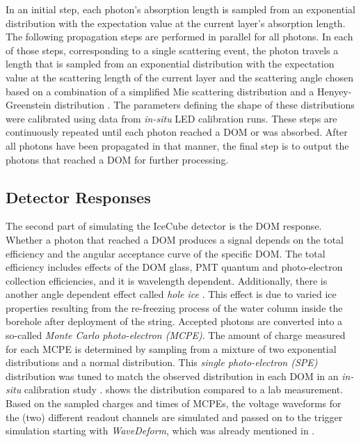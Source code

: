 In an initial step, each photon's absorption length is sampled from an exponential distribution with the expectation value at the current layer's absorption length. The following propagation steps are performed in parallel for all photons. In each of those steps, corresponding to a single scattering event, the photon travels a length that is sampled from an exponential distribution with the expectation value at the scattering length of the current layer and the scattering angle chosen based on a combination of a simplified Mie scattering distribution  and a Henyey-Greenstein distribution . The parameters defining the shape of these distributions were calibrated using data from \textit{in-situ} LED calibration runs. These steps are continuously repeated until each photon reached a DOM or was absorbed. After all photons have been propagated in that manner, the final step is to output the photons that reached a DOM for further processing.


\subsection{Detector Responses}

The second part of simulating the IceCube detector is the DOM response. Whether a photon that reached a DOM produces a signal depends on the total efficiency and the angular acceptance curve of the specific DOM. The total efficiency includes effects of the DOM glass, PMT quantum and photo-electron collection efficiencies, and it is wavelength dependent. Additionally, there is another angle dependent effect called \textit{hole ice} . This effect is due to varied ice properties resulting from the re-freezing process of the water column inside the borehole after deployment of the string.
Accepted photons are converted into a so-called \textit{Monte Carlo photo-electron (MCPE)}. The amount of charge measured for each MCPE is determined by sampling from a mixture of two exponential distributions and a normal distribution. This \textit{single photo-electron (SPE)} distribution was tuned to match the observed distribution in each DOM in an \textit{in-situ} calibration study .  shows the distribution compared to a lab measurement. Based on the sampled charges and times of MCPEs, the voltage waveforms for the (two) different readout channels are simulated and passed on to the trigger simulation starting with \textit{WaveDeform}, which was already mentioned in .

